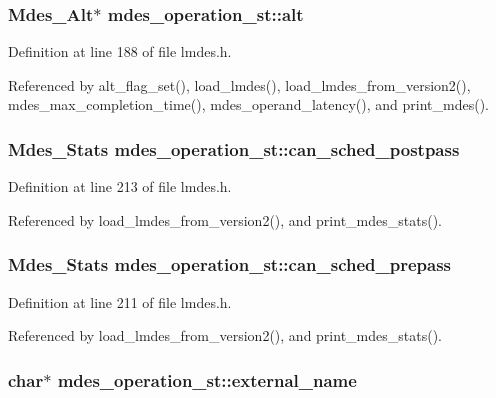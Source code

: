 \subsubsection{\setlength{\rightskip}{0pt plus 5cm}\bf{Mdes\_\-Alt}$\ast$ \bf{mdes\_\-operation\_\-st::alt}}\label{structmdes__operation__st_7b463d984afbfb2ccf7641f7c0927f10}




Definition at line 188 of file lmdes.h.

Referenced by alt\_\-flag\_\-set(), load\_\-lmdes(), load\_\-lmdes\_\-from\_\-version2(), mdes\_\-max\_\-completion\_\-time(), mdes\_\-operand\_\-latency(), and print\_\-mdes().
\subsubsection{\setlength{\rightskip}{0pt plus 5cm}\bf{Mdes\_\-Stats} \bf{mdes\_\-operation\_\-st::can\_\-sched\_\-postpass}}\label{structmdes__operation__st_64677ab60d5633447c7ac023148b3bf4}




Definition at line 213 of file lmdes.h.

Referenced by load\_\-lmdes\_\-from\_\-version2(), and print\_\-mdes\_\-stats().
\subsubsection{\setlength{\rightskip}{0pt plus 5cm}\bf{Mdes\_\-Stats} \bf{mdes\_\-operation\_\-st::can\_\-sched\_\-prepass}}\label{structmdes__operation__st_c9735c79bc15e2c40c3695bb9eda233f}




Definition at line 211 of file lmdes.h.

Referenced by load\_\-lmdes\_\-from\_\-version2(), and print\_\-mdes\_\-stats().
\subsubsection{\setlength{\rightskip}{0pt plus 5cm}char$\ast$ \bf{mdes\_\-operation\_\-st::external\_\-name}}\label{structmdes__operation__st_19afc4e397c1e5e4f7dfa743947997a7}




